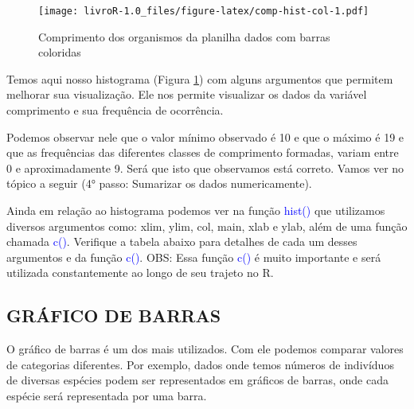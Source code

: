 \documentclass[titlepage, oneside, openany, a4paper]{book}
\newenvironment{Shaded}{\begin{snugshade}}{\end{snugshade}}
\newcommand{\DataTypeTok}[1]{\textcolor[rgb]{0.13,0.29,0.53}{#1}}
\newcommand{\DecValTok}[1]{\textcolor[rgb]{0.00,0.00,0.81}{#1}}
\newcommand{\KeywordTok}[1]{\textcolor[rgb]{0.13,0.29,0.53}{\textbf{#1}}}
\newcommand{\NormalTok}[1]{#1}
\newcommand{\OperatorTok}[1]{\textcolor[rgb]{0.81,0.36,0.00}{\textbf{#1}}}
\newcommand{\StringTok}[1]{\textcolor[rgb]{0.31,0.60,0.02}{#1}}
\begin{document}
\begin{Shaded}
\end{Shaded}

\begin{figure}
\centering
\texttt{[image: livroR-1.0\_files/figure-latex/comp-hist-col-1.pdf]}
\caption{\label{fig:comp-hist-col}Comprimento dos organismos da planilha dados com barras coloridas}
\end{figure}

Temos aqui nosso histograma (Figura \ref{fig:comp-hist-col}) com alguns argumentos que permitem melhorar sua visualização. Ele nos permite visualizar os dados da variável comprimento e sua frequência de ocorrência.

Podemos observar nele que o valor mínimo observado é 10 e que o máximo é 19 e que as frequências das diferentes classes de comprimento formadas, variam entre 0 e aproximadamente 9. Será que isto que observamos está correto. Vamos ver no tópico a seguir (4° passo: Sumarizar os dados numericamente).

Ainda em relação ao histograma podemos ver na função \textcolor{blue}{hist()} que utilizamos diversos argumentos como: xlim, ylim, col, main, xlab e ylab, além de uma função chamada \textcolor{blue}{c()}. Verifique a tabela abaixo para detalhes de cada um desses argumentos e da função \textcolor{blue}{c()}. OBS: Essa função \textcolor{blue}{c()} é muito importante e será utilizada constantemente ao longo de seu trajeto no R.

\hypertarget{gruxe1fico-de-barras}{%
\subsection{GRÁFICO DE BARRAS}\label{gruxe1fico-de-barras}}

O gráfico de barras é um dos mais utilizados. Com ele podemos comparar valores de categorias diferentes. Por exemplo, dados onde temos números de indivíduos de diversas espécies podem ser representados em gráficos de barras, onde cada espécie será representada por uma barra.
\end{document}
